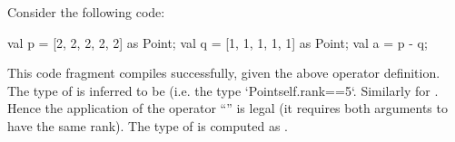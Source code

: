 \begin{example}
Consider the following code:  



\begin{xten}
val p  = [2, 2, 2, 2, 2] as Point;
val q = [1, 1, 1, 1, 1] as Point;
val a = p - q;    
\end{xten}
This code fragment compiles successfully, given the above operator definition. 
The type of  is inferred to be  (i.e.{} the type 
\xcd`Point{self.rank==5}`.
Similarly for . Hence the application of the operator ``\Xcd{-}'' is legal (it requires both arguments to have the same rank). The type of  is computed as .
\end{example}
